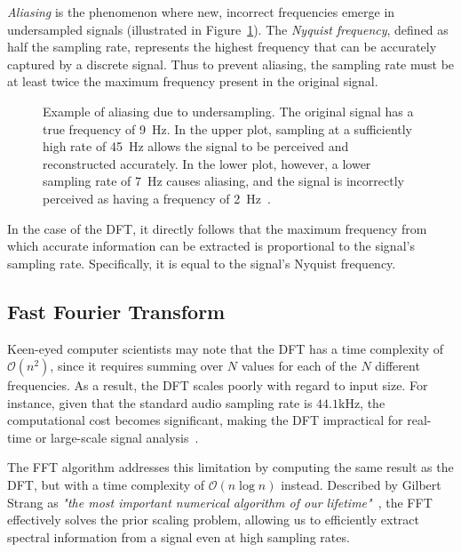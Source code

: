 \textit{Aliasing} is the phenomenon where new, incorrect frequencies emerge in undersampled signals (illustrated in Figure~\ref{AliasingFigure}). The \textit{Nyquist frequency}, defined as half the sampling rate, represents the highest frequency that can be accurately captured by a discrete signal. Thus to prevent aliasing, the sampling rate must be at least twice the maximum frequency present in the original signal.

\begin{figure}[H]
    \centering
    
    \caption{Example of aliasing due to undersampling. The original signal has a true frequency of 9~Hz. In the upper plot, sampling at a sufficiently high rate of 45~Hz allows the signal to be perceived and reconstructed accurately. In the lower plot, however, a lower sampling rate of 7~Hz causes aliasing, and the signal is incorrectly perceived as having a frequency of 2~Hz~\cite{nationalinstruments_signal_processing_2012}.}
    \label{AliasingFigure}
\end{figure}

In the case of the \gls{DFT}, it directly follows that the maximum frequency from which accurate information can be extracted is proportional to the signal's sampling rate. Specifically, it is equal to the signal's Nyquist frequency.

\subsection{Fast Fourier Transform}

Keen-eyed computer scientists may note that the \gls{DFT} has a time complexity of $\mathcal{O}(n^2)$, since it requires summing over $N$ values for each of the $N$ different frequencies. As a result, the \gls{DFT} scales poorly with regard to input size. For instance, given that the standard audio sampling rate is $44.1 \text{kHz}$, the computational cost becomes significant, making the \gls{DFT} impractical for real-time or large-scale signal analysis~\cite{pras2010sampling}.

The \gls{FFT} algorithm addresses this limitation by computing the same result as the \gls{DFT}, but with a time complexity of $\mathcal{O}(n\log{n})$ instead. Described by Gilbert Strang as \textit{"the most important numerical algorithm of our lifetime"}~\cite{strang1993wavelet}, the \gls{FFT} effectively solves the prior scaling problem, allowing us to efficiently extract spectral information from a signal even at high sampling rates.

